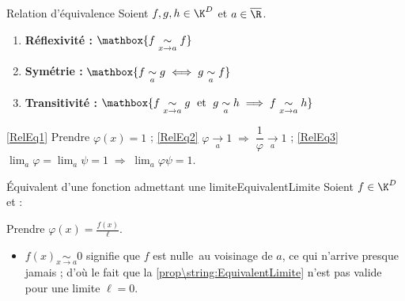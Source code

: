 \documentclass[12pt,a4paper]{report}
\begin{document}
\begin{propositions}{Relation d'équivalence}{}
    Soient $f, g, h \in \K^D$ et $a \in \overline{\R}$.
    \begin{enumerate}
        \item\label{RelEq1} \textbf{Réflexivité :} $\mathbox{f \underset{x \to a}{\sim} f}$
        \item\label{RelEq2} \textbf{Symétrie :} $\mathbox{f \underset{a}{\sim} g \; \Longleftrightarrow \; g \underset{a}{\sim} f}$
        \item\label{RelEq3} \textbf{Transitivité :} $\mathbox{f \underset{x \to a}{\sim} g \; \text{ et } \; g \underset{a}{\sim} h \; \Longrightarrow \; f \underset{x \to a}{\sim} h}$
    \end{enumerate}
\end{propositions}

\begin{demo}
    \begin{center}
	    \ref{RelEq1} Prendre $\varphi(x) = 1$ ;
	    \hfill
	    \ref{RelEq2} $\varphi \xrightarrow[a]{} 1 \; \Longrightarrow \; \dfrac{1}{\varphi} \xrightarrow[a]{} 1$ ;
	    \hfill
	    \ref{RelEq3} $\displaystyle \lim_a \varphi = \lim_a \psi = 1 \; \Longrightarrow \; \lim_a \varphi\psi = 1$.
    \end{center}
\end{demo}

\begin{proposition}{\'Equivalent d'une fonction admettant une limite}{EquivalentLimite}
    Soient $f \in \K^D$ et \strong{$\ell \in \R^*$} : \hfill {} \hspace*{\fill}
\end{proposition}

\begin{demo}
Prendre $\varphi(x) = \frac{f(x)}{\ell}$.
\end{demo}

\begin{remarque}
    \begin{itemize}
        \item[\danger] $f(x) \underset{x \to a}{\sim} 0$ signifie que $f$ est nulle\footnotemark\ au voisinage de $a$, ce qui n'arrive presque jamais ; d'où le fait que la \cref{prop\string:EquivalentLimite} n'est pas valide pour une limite $\ell = 0$.
    \end{itemize}
\end{remarque}
\end{document}

